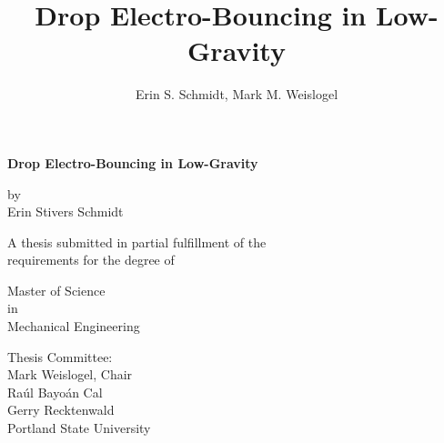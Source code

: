 \documentclass[12pt,a4paper,oneside]{book}
\title{\textsf{\textbf{Drop Electro-Bouncing in Low-Gravity}}}
\author{Erin S. Schmidt, Mark M. Weislogel}
\date{}
\newcommand\blankpage{%
    \null
    \thispagestyle{empty}%
    \addtocounter{page}{-1}%
    \newpage}
\begin{document}
\begin{titlepage}
\doublespacing

\centering %
{\large \textsf{\textbf{Drop Electro-Bouncing in Low-Gravity}}}

\vspace{15ex}
by\\
Erin Stivers Schmidt

\vspace{15ex}
\singlespacing
A thesis submitted in partial fulfillment of the\\
requirements for the degree of

\vspace{11ex}
Master of Science\\
in\\
Mechanical Engineering

\vspace{12ex}
Thesis Committee:\\
Mark Weislogel, Chair\\
Ra\'ul Bayo\'an Cal\\
Gerry Recktenwald\\


\vfill
\vspace{2ex}
Portland State University\\%
{\number\year}
\end{titlepage}


\doublespacing
\clearpage

\frontmatter

\doublespacing
\end{document}
